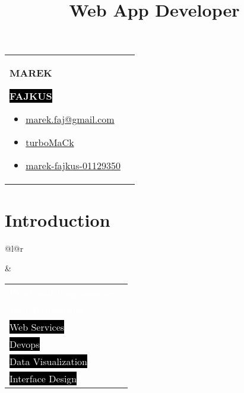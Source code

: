 \documentclass[9pt]{article}
\makeatletter
\def\firstname{Marek}
\def\lastname{Fajkus}
\def\faEmail{{\FAFR \symbol{"F0E0}}} %
\def\faLinkedin{\FAB \symbol{"F08C}} %
\def\faGithub{\FAB \symbol{"F09B}} %
\def\faStarEmpty{\FAFR \symbol{"F005}} %
\def\faStarFull{\FAFS \symbol{"F005}} %
\def\faStarHalf{\FAFS \symbol{"F5C0}} %
\renewcommand{\maketitle}{
  \begin{tabular}{@{}l l}
    \begin{minipage}[t]{0.65\textwidth}
      {\Huge \textbf {\MakeUppercase{\firstname}}}

      \vspace{0.2cm}

      \colorbox{black}{
        {\huge \textbf {\textcolor{white}{\MakeUppercase{\lastname}}}}
      }

      \vspace{0.4cm}

      {\LARGE\emph\thetitle}
    \end{minipage}

    \begin{minipage}[t]{0.35\textwidth}
      \vspace{-\baselineskip} %
      \begin{itemize}
        \itemsep0em
      \vspace{-0.5cm}
      \item \href{mailto:marek.faj@gmail.com}{
        \colorbox{ProcessBlue}{\textcolor{white}{\faEmail}} { \textcolor{ProcessBlue}{marek.faj@gmail.com}}
      }
      \item \href{https://github.com/turbomack}{
        \colorbox{black}{\textcolor{white}{\faGithub}} { turboMaCk}
      }
      \item \href{https://www.linkedin.com/in/marek-fajkus-01129350/}{
        \colorbox{black}{\textcolor{white}{\faLinkedin}} { marek-fajkus-01129350}
      }
      \end{itemize}
    \end{minipage}
  \end{tabular}

  \vspace{0.5cm}
}
\makeatother
\begin{document}
\title{Web App Developer}
\maketitle

\section{Introduction}

\begin{tabular}{@{}l@{\hskip 10pt}r}
    \begin{minipage}[l]{0.6\textwidth}
      \blindtext
    \end{minipage}
    &
    \begin{minipage}[r]{0.39\textwidth}
      \setlength\tabcolsep{5pt}
      \begin{tabularx}{\textwidth}{Xr}
          \colorbox{ProcessBlue}{\textcolor{white}{Functional Programming}} &
          \vspace{0.2cm}
          \textcolor{ProcessBlue}{\faStarFull \faStarFull \faStarFull \faStarEmpty \faStarEmpty} \\

          \colorbox{ProcessBlue}{\textcolor{white}{Web Technologies}} &
          \vspace{0.2cm}
          \textcolor{ProcessBlue}{\faStarFull \faStarFull \faStarFull \faStarFull \faStarEmpty} \\

          \colorbox{black}{\textcolor{white}{Web Services}} &
          \vspace{0.2cm}
          \faStarFull \faStarFull \faStarFull \faStarEmpty \faStarEmpty \\

          \colorbox{black}{\textcolor{white}{Devops}} &
          \vspace{0.2cm}
          \faStarFull \faStarFull \faStarHalf \faStarEmpty \faStarEmpty \\

          \colorbox{black}{\textcolor{white}{Data Visualization}} &
          \vspace{0.2cm}
          \faStarFull \faStarFull \faStarFull \faStarEmpty \faStarEmpty \\

          \colorbox{black}{\textcolor{white}{Interface Design}} &
          \vspace{0.2cm}
          \faStarFull \faStarFull \faStarHalf \faStarEmpty \faStarEmpty \\


\end{tabularx}
\end{minipage}
\end{tabular}
\end{document}
